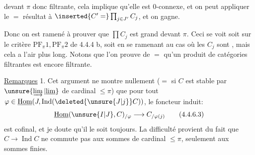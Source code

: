  devant $\pi$ donc filtrante, cela implique qu'elle est $0$-connexe, et on peut appliquer le $=$ résultat à $\inserted{C'=}\prod_{j\in J'}C_j$, et on gagne.

Donc on est ramené à prouver que  $\prod C_j$ est grand devant $\pi$. Ceci  se voit soit sur le critère $\mathrm{PF}_{\pi}1,\mathrm{PF}_{\pi}2$ de 4.4.4 b, soit  en se ramenant au cas  où les $C_j$ sont , mais cela a l'air plus long. Notons que l'on prouve de $=$ qu'un  produit de catégories filtrantes est encore  filtrante.

\uline{Remarques} 1. Cet argument ne montre nullement ($=$ si $C$ est stable par $\unsure{\varinjlim|\underline{\lim}}$ de cardinal $\leq\pi$) que pour tout $\varphi\in\underline{\operatorname{Hom}}(J,\operatorname{Ind}(\deleted{\unsure{J|j}}C))$, le foncteur induit:
\[
\underline{\operatorname{Hom}}(\unsure{I|J},C)_{/\varphi}\longrightarrow C_{/\varphi(j)}
\tag*{(4.4.6.3)}
\]
est cofinal, et je doute qu'il le soit toujours. La difficulté provient du fait que $C\longrightarrow\operatorname{Ind}C$ ne commute pas aux sommes de cardinal $\leq\pi$, seulement aux sommes finies.
